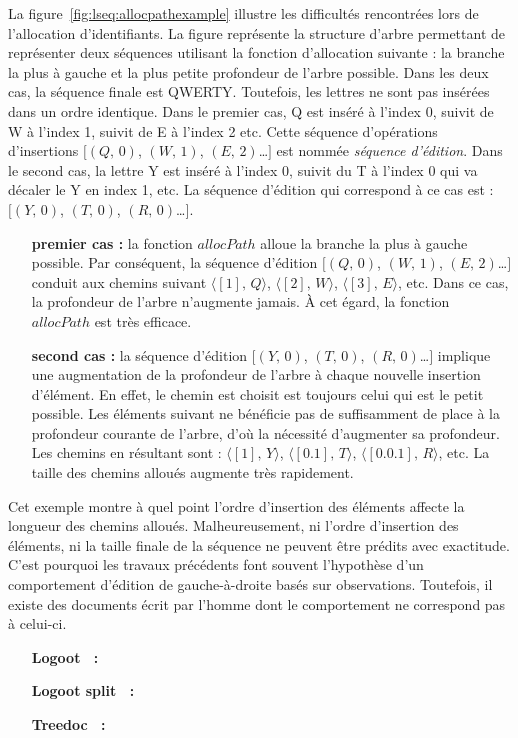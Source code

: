 La figure~\ref{fig:lseq:allocpathexample} illustre les difficultés rencontrées lors
de l'allocation d'identifiants. La figure représente la structure d'arbre
permettant de représenter deux séquences utilisant la fonction d'allocation
suivante : la branche la plus à gauche et la plus petite profondeur de l'arbre
possible. Dans les deux cas, la séquence finale est QWERTY. Toutefois, les
lettres ne sont pas insérées dans un ordre identique. Dans le premier cas, Q est
inséré à l'index 0, suivit de W à l'index 1, suivit de E à l'index 2 etc. Cette
séquence d'opérations d'insertions $[(Q,\,0)$, $(W,\,1)$, $(E,\,2)$\ldots$]$ est
nommée \emph{séquence d'édition}. Dans le second cas, la lettre Y est inséré à
l'index 0, suivit du T à l'index 0 qui va décaler le Y en index 1, etc. La
séquence d'édition qui correspond à ce cas est : $[(Y,\,0)$, $(T,\,0)$,
$(R,\,0)$\ldots$]$.
\begin{itemize}
\item [\textbf{premier cas :}] la fonction $allocPath$ alloue la branche la plus
  à gauche possible. Par conséquent, la séquence d'édition $[(Q,\,0)$,
  $(W,\,1)$, $(E,\,2)$\ldots$]$ conduit aux chemins suivant
  $\langle [1],\,Q\rangle$, $\langle [2],\, W \rangle$,
  $\langle [3],\, E\rangle$, etc. Dans ce cas, la profondeur de l'arbre
  n'augmente jamais. À cet égard, la fonction $allocPath$ est très efficace.
\item [\textbf{second cas :}] la séquence d'édition $[(Y,\,0)$, $(T,\,0)$,
  $(R,\,0)$\ldots$]$ implique une augmentation de la profondeur de l'arbre à
  chaque nouvelle insertion d'élément. En effet, le chemin est choisit est
  toujours celui qui est le petit possible. Les éléments suivant ne bénéficie
  pas de suffisamment de place à la profondeur courante de l'arbre, d'où la
  nécessité d'augmenter sa profondeur. Les chemins en résultant sont :
  $\langle [1],\, Y\rangle$, $\langle[0.1],\,T\rangle$,
  $\langle[0.0.1],\, R\rangle$, etc. La taille des chemins alloués augmente très
  rapidement.
\end{itemize}

Cet exemple montre à quel point l'ordre d'insertion des éléments affecte la
longueur des chemins alloués. Malheureusement, ni l'ordre d'insertion des
éléments, ni la taille finale de la séquence ne peuvent être prédits avec
exactitude. C'est pourquoi les travaux précédents font souvent l'hypothèse d'un
comportement d'édition de gauche-à-droite basés sur observations. Toutefois, il
existe des documents écrit par l'homme dont le comportement ne correspond pas à
celui-ci.

\begin{itemize}
\item [\textbf{Logoot~\cite{weiss2009logoot, weiss2010logootundo} :}]
\item [\textbf{Logoot split~\cite{mehdi2014merging} :}]
\item [\textbf{Treedoc~\cite{shapiro2011comprehensive} :}]
\end{itemize}


